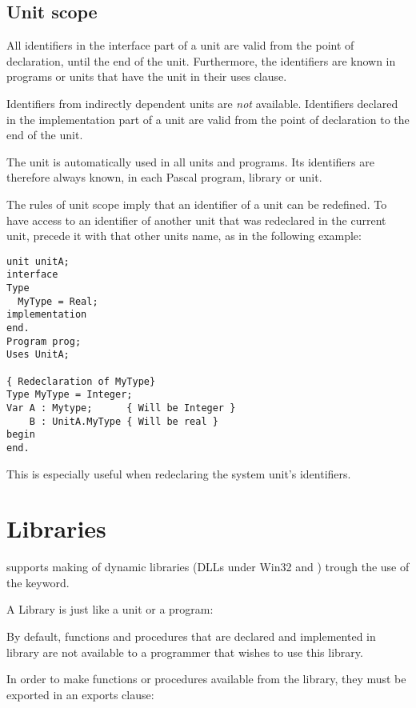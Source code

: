 \subsection{Unit scope}
All identifiers in the interface part of a unit are valid from the point of
declaration, until the end of the unit. Furthermore, the identifiers are
known in programs or units that have the unit in their uses clause.

Identifiers from indirectly dependent units are {\em not} available.
Identifiers declared in the implementation part of a unit are valid from the
point of declaration to the end of the unit.

The  unit is automatically used in all units and programs.
Its identifiers are therefore always known, in each Pascal program, library
or unit.

The rules of unit scope imply that an identifier of a unit can be redefined. 
To have access to an identifier of another unit that was redeclared in
the current unit, precede it with that other units name, as in the following
example:
\begin{verbatim}
unit unitA;
interface
Type
  MyType = Real;
implementation
end.
Program prog;
Uses UnitA;

{ Redeclaration of MyType}
Type MyType = Integer;
Var A : Mytype;      { Will be Integer }
    B : UnitA.MyType { Will be real }
begin
end.
\end{verbatim}
This is especially useful when redeclaring the system unit's identifiers.

\section{Libraries}
\fpc supports making of dynamic libraries (DLLs under Win32 and \ostwo) trough
the use of the  keyword.

A Library is just like a unit or a program:


By default, functions and procedures that are declared and implemented in
library are not available to a programmer that wishes to use this library.

In order to make functions or procedures available from the library,
they must be exported in an exports clause:



